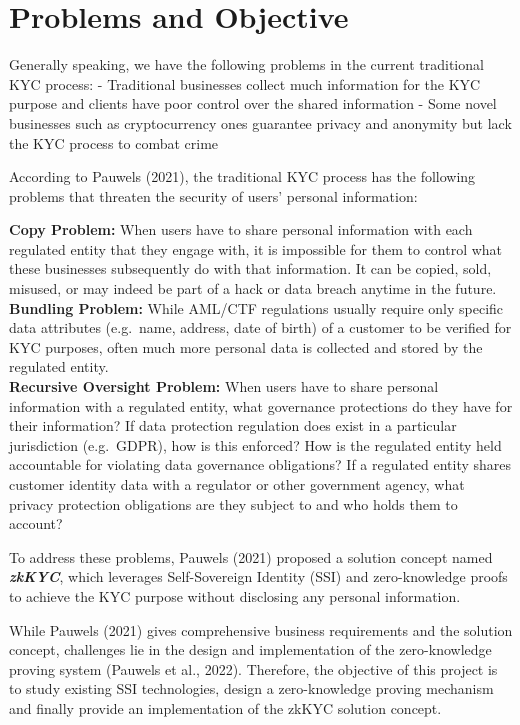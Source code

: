 \documentclass[
]{report}
\begin{document}
\chapter{Problems and Objective}

Generally speaking, we have the following problems in the current
traditional KYC process: - Traditional businesses collect much
information for the KYC purpose and clients have poor control over the
shared information - Some novel businesses such as cryptocurrency ones
guarantee privacy and anonymity but lack the KYC process to combat crime

According to Pauwels (2021), the traditional KYC process has the
following problems that threaten the security of users' personal
information:

\begin{myquote}
\textbf{Copy Problem:} When users have to share personal
information with each regulated entity that they engage with, it is
impossible for them to control what these businesses subsequently do
with that information. It can be copied, sold, misused, or may indeed be
part of a hack or data breach anytime in the future.\\
\textbf{Bundling Problem:} While AML/CTF regulations usually
require only specific data attributes (e.g.~name, address, date of
birth) of a customer to be verified for KYC purposes, often much more
personal data is collected and stored by the regulated entity.\\
\textbf{Recursive Oversight Problem:} When users have to share
personal information with a regulated entity, what governance
protections do they have for their information? If data protection
regulation does exist in a particular jurisdiction (e.g.~GDPR), how is
this enforced? How is the regulated entity held accountable for
violating data governance obligations? If a regulated entity shares
customer identity data with a regulator or other government agency, what
privacy protection obligations are they subject to and who holds them to
account?
\end{myquote}

To address these problems, Pauwels (2021) proposed a solution concept
named \textbf{\emph{zkKYC}}, which leverages Self-Sovereign Identity
(SSI) and zero-knowledge proofs to achieve the KYC purpose without
disclosing any personal information.

While Pauwels (2021) gives comprehensive business requirements and the
solution concept, challenges lie in the design and implementation of the
zero-knowledge proving system (Pauwels et al., 2022). Therefore, the
objective of this project is to study existing SSI technologies, design
a zero-knowledge proving mechanism and finally provide an implementation
of the zkKYC solution concept.
\end{document}
